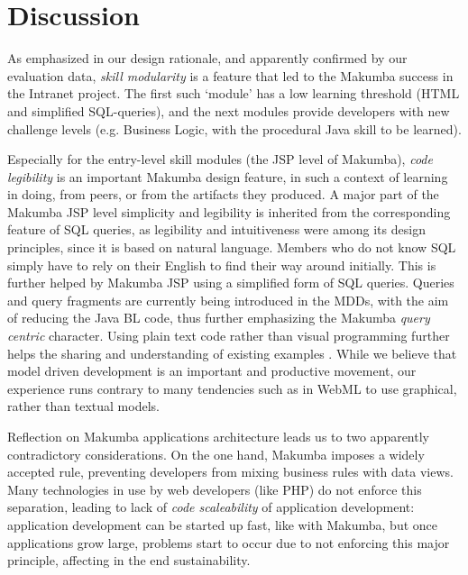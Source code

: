 \documentclass{llncs}
\begin{document}
\section{Discussion}\label{sec:disco}
As emphasized in our design rationale, and apparently confirmed by our evaluation data, \textit{skill modularity} is a feature that led to the Makumba success in the Intranet project. The first such `module' has a low learning threshold (HTML and simplified SQL-queries), and the next modules provide developers with new challenge levels (e.g. Business Logic, with the procedural Java skill to be learned).

Especially for the entry-level skill modules (the JSP level of Makumba), \textit{code legibility} is an important Makumba design feature, in such a context of learning in doing, from peers, or from the artifacts they produced. 
A major part of the Makumba JSP level simplicity and legibility is inherited from the corresponding feature of SQL queries, as legibility and intuitiveness were among its design principles, since it is based on natural language. Members who do not know SQL simply have to rely on their English to find their way around initially. This is further helped by Makumba JSP using a simplified form of SQL queries. Queries and query fragments are currently being introduced in the MDDs, with the aim of reducing the Java BL code, thus further emphasizing the Makumba \textit{query centric} character. Using plain text code rather than visual programming further helps the sharing and understanding of existing examples \cite{yamauchi00}. While we believe that model driven development is an important and productive movement, our experience runs contrary to many tendencies such as in WebML \cite{Ceri00webmodeling} to use graphical, rather than textual models.

Reflection on Makumba applications architecture leads us to two apparently contradictory considerations. On the one hand, Makumba imposes a widely accepted rule, preventing developers from mixing business rules with data views. Many technologies in use by web developers (like PHP) do not enforce this separation, leading to lack of \textit{code scaleability} of application development: application development can be started up fast, like with Makumba, but once applications grow large, problems start to occur due to not enforcing this major principle, affecting in the end sustainability.  
\end{document}
